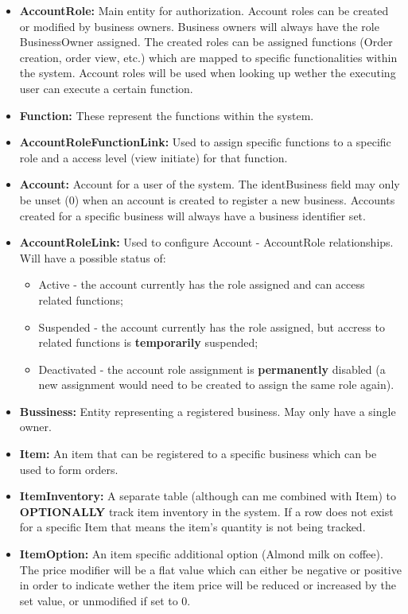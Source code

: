 \documentclass[11pt,a4paper,pdftex]{article}
\begin{document}
\begin{itemize}
    \item \textbf{AccountRole:} Main entity for authorization. Account roles can be created or modified by business owners. Business owners will always have the role BusinessOwner assigned. The created roles can be assigned functions (Order creation, order view, etc.) which are mapped to specific functionalities within the system. Account roles will be used when looking up wether the executing user can execute a certain function.
    \item \textbf{Function:} These represent the functions within the system.
    \item \textbf{AccountRoleFunctionLink:} Used to assign specific functions to a specific role and a access level (view initiate) for that function.
    \item \textbf{Account:} Account for a user of the system. The identBusiness field may only be unset (0) when an account is created to register a new business. Accounts created for a specific business will always have a business identifier set.
    \item \textbf{AccountRoleLink:} Used to configure Account - AccountRole relationships. Will have a possible status of: 
    \begin{itemize}
        \item Active - the account currently has the role assigned and can access related functions;
        \item Suspended - the account currently has the role assigned, but accress to related functions is \textbf{temporarily} suspended;
        \item Deactivated - the account role assignment is \textbf{permanently} disabled (a new assignment would need to be created to assign the same role again).
    \end{itemize}
    \item \textbf{Bussiness:} Entity representing a registered business. May only have a single owner.
    \item \textbf{Item:} An item that can be registered to a specific business which can be used to form orders.
    \item \textbf{ItemInventory:} A separate table (although can me combined with Item) to \textbf{OPTIONALLY} track item inventory in the system. If a row does not exist for a specific Item that means the item's quantity is not being tracked.
    \item \textbf{ItemOption:} An item specific additional option (Almond milk on coffee). The price modifier will be a flat value which can either be negative or positive in order to indicate wether the item price will be reduced or increased by the set value, or unmodified if set to 0.

\end{itemize}
\end{document}
